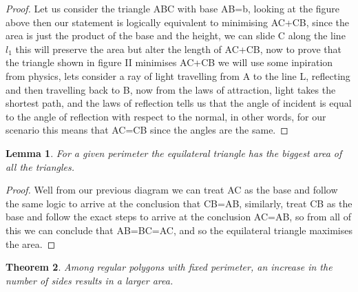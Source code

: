 \documentclass[a4paper]{book}
\newtheorem{theorem}{Theorem}%
\newtheorem{lemma}[theorem]{Lemma}%
\begin{document}
\begin{proof} 
    Let us consider the triangle ABC with base AB=b, looking at the figure above then our statement is logically equivalent to minimising AC+CB, since the area is just the product of the base and the height, we can slide C along the line $l_1$ this will preserve the area but alter the length of AC+CB, now to prove that the triangle shown in figure II minimises AC+CB we will use some inpiration from physics, lets consider a ray of light travelling from A to the line L, reflecting and then travelling back to B, now from the laws of attraction, light takes the shortest path, and the laws of reflection tells us that the angle of incident is equal to the angle of reflection with respect to the normal, in other words, for our scenario this means that AC=CB since the angles are the same. 
\end{proof}

\begin{lemma}
    For a given perimeter the equilateral triangle has the biggest area of all the triangles. 
\end{lemma}
\begin{proof} 
    Well from our previous diagram we can treat AC as the base and follow the same logic to arrive at the conclusion that CB=AB, similarly, treat CB as the base and follow the exact steps to arrive at the conclusion AC=AB, so from all of this we can conclude that AB=BC=AC, and so the equilateral triangle maximises the area.
\end{proof}

\begin{theorem}
    Among regular polygons with fixed perimeter, an increase in the number of sides results in a larger area.    
\end{theorem} 
\end{document}
